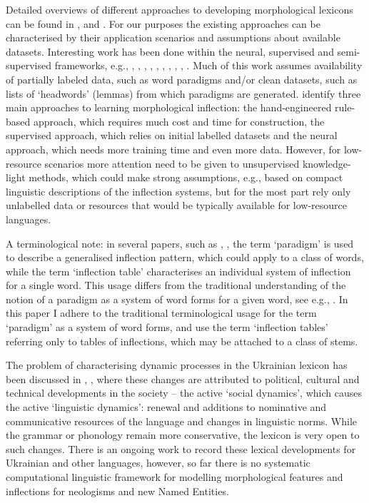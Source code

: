\documentclass[11pt,a4paper]{article}
\begin{document}
Detailed overviews of different approaches to developing morphological lexicons can be found in \cite{ahlberg2015paradigm}, \cite{koskenniemi2018guessing} and  \cite{fam2018ips}. For our purposes the existing approaches can be characterised by their application scenarios and assumptions about available datasets. Interesting work has been done within the neural, supervised and semi-supervised frameworks, e.g., \cite{ahlberg2015paradigm}, \cite{hulden2014semi}, \cite{koskenniemi2018guessing}, \cite{silfverberg2018computational}, \cite{wolf2018structured}, \cite{kirov2018recurrent}, \cite{faruqui2016morpho}, \cite{faruqui2015morphological}, \cite{aharoni2016morphological}, \cite{cotterell2017paradigm}. Much of this work assumes availability of partially labeled data, such as word paradigms and/or clean datasets, such as lists of `headwords' (lemmas) from which paradigms are generated. \cite{fam2018ips} identify three main approaches to learning morphological inflection: the hand-engineered rule-based approach, which requires much cost and time for construction, the supervised approach, which relies on initial labelled datasets and the neural approach, which needs more training time and even more data. However, for low-resource scenarios more attention need to be given to unsupervised knowledge-light methods, which could make strong assumptions, e.g., based on compact  linguistic descriptions of the inflection systems, but for the most part rely only unlabelled data or resources that would be typically available for low-resource languages.

A terminological note: in several papers, such as \cite{ahlberg2015paradigm}, \cite{silfverberg2018computational}, the term `paradigm' is used to describe a generalised inflection pattern, which could apply to a class of words, while the term `inflection table' characterises an individual system of inflection for a single word. This usage differs from the traditional understanding of the notion of a paradigm as a system of word forms for a given word, see e.g., \cite{spencer2001paradigm}. In this paper I adhere to the traditional terminological usage for the term `paradigm' as a system of word forms, and use the term `inflection tables' referring only to tables of inflections, which may be attached to a class of stems.

The problem of characterising dynamic processes in the Ukrainian lexicon has been discussed in \cite{klymenko2008dynamichni}, \cite{karpilovska2013aktyvni}, where these changes are attributed to political, cultural and technical developments in the society -- the active `social dynamics', which causes the active `linguistic dynamics': renewal and additions to nominative and communicative resources of the language and changes in linguistic norms. While the grammar or phonology remain more conservative, the lexicon is very open to such changes. There is an ongoing work to record these lexical developments for Ukrainian and other languages, however, so far there is no systematic computational linguistic framework for modelling morphological features and inflections for neologisms and new Named Entities.
\end{document}
